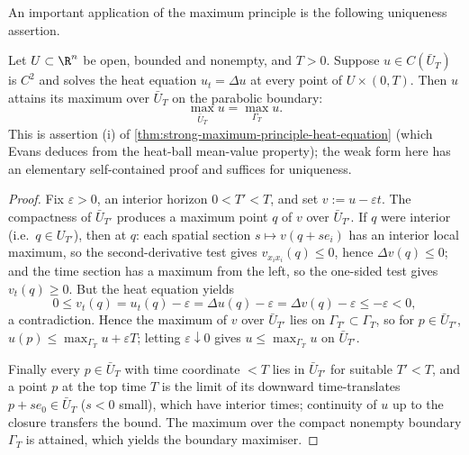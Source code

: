 An important application of the maximum principle is the following uniqueness assertion.

\begin{theorem}
\label{thm:weak-maximum-principle-heat}
\leanok
Let $U \subset \R^n$ be open, bounded and nonempty, and $T > 0$. Suppose
$u \in C(\bar{U}_T)$ is $C^2$ and solves the heat equation $u_t = \Delta u$ at every
point of $U \times (0,T)$. Then $u$ attains its maximum over $\bar{U}_T$ on the
parabolic boundary:
$$\max_{\bar{U}_T} u = \max_{\Gamma_T} u.$$
This is assertion (i) of \cref{thm:strong-maximum-principle-heat-equation} (which
Evans deduces from the heat-ball mean-value property); the weak form here has an
elementary self-contained proof and suffices for uniqueness.
\end{theorem}

\begin{proof}
\leanok
Fix $\varepsilon > 0$, an interior horizon $0 < T' < T$, and set
$v := u - \varepsilon t$. The compactness of $\bar{U}_{T'}$ produces a maximum point
$q$ of $v$ over $\bar{U}_{T'}$. If $q$ were interior (i.e.\ $q \in U_{T'}$), then at
$q$: each spatial section $s \mapsto v(q + s e_i)$ has an interior local maximum, so
the second-derivative test gives $v_{x_i x_i}(q) \le 0$, hence $\Delta v(q) \le 0$;
and the time section has a maximum from the left, so the one-sided test gives
$v_t(q) \ge 0$. But the heat equation yields
$$0 \le v_t(q) = u_t(q) - \varepsilon = \Delta u(q) - \varepsilon
   = \Delta v(q) - \varepsilon \le -\varepsilon < 0,$$
a contradiction. Hence the maximum of $v$ over $\bar{U}_{T'}$ lies on
$\Gamma_{T'} \subset \Gamma_T$, so for $p \in \bar{U}_{T'}$,
$u(p) \le \max_{\Gamma_T} u + \varepsilon T$; letting $\varepsilon \downarrow 0$
gives $u \le \max_{\Gamma_T} u$ on $\bar{U}_{T'}$.

Finally every $p \in \bar{U}_T$ with time coordinate $< T$ lies in $\bar{U}_{T'}$ for
suitable $T' < T$, and a point $p$ at the top time $T$ is the limit of its downward
time-translates $p + s e_0 \in \bar{U}_T$ ($s < 0$ small), which have interior times;
continuity of $u$ up to the closure transfers the bound. The maximum over the compact
nonempty boundary $\Gamma_T$ is attained, which yields the boundary maximiser.
\end{proof}

